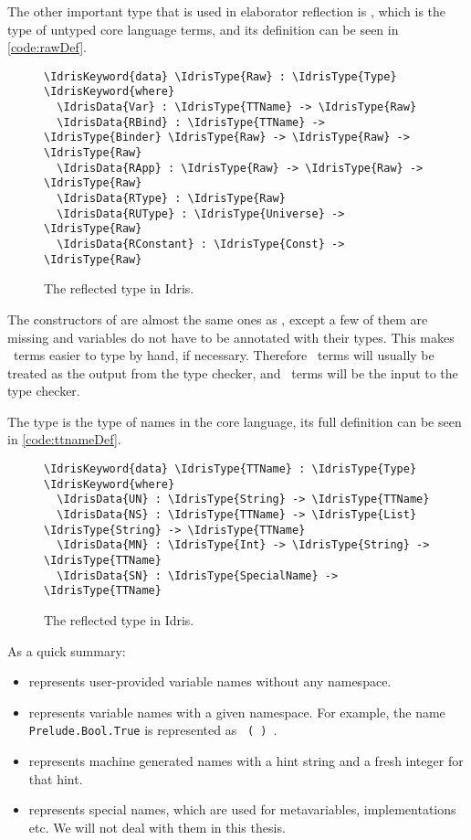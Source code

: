 The other important type that is used in elaborator reflection is ,
which is the type of untyped core language terms, and its definition can be
seen in \autoref{code:rawDef}.

\begin{figure}[ht]
\caption{The reflected type \protect{} in Idris.}
\label{code:rawDef}
\begin{Verbatim}[framesep=2mm, label=\footnotesize{\normalfont{Idris}}, labelposition=topline]
\IdrisKeyword{data} \IdrisType{Raw} : \IdrisType{Type} \IdrisKeyword{where}
  \IdrisData{Var} : \IdrisType{TTName} -> \IdrisType{Raw}
  \IdrisData{RBind} : \IdrisType{TTName} -> \IdrisType{Binder} \IdrisType{Raw} -> \IdrisType{Raw} -> \IdrisType{Raw}
  \IdrisData{RApp} : \IdrisType{Raw} -> \IdrisType{Raw} -> \IdrisType{Raw}
  \IdrisData{RType} : \IdrisType{Raw}
  \IdrisData{RUType} : \IdrisType{Universe} -> \IdrisType{Raw}
  \IdrisData{RConstant} : \IdrisType{Const} -> \IdrisType{Raw}
\end{Verbatim}
\end{figure}

The constructors of  are almost the same ones as \TT,
except a few of them are missing and variables do not have to be annotated with
their types. This makes \Raw\ terms easier to type by hand, if necessary.
Therefore \TT\ terms will usually be treated as the output from the type
checker, and \Raw\ terms will be the input to the type checker.

The  type is the type of names in the core language, its full definition can be seen in \autoref{code:ttnameDef}.

\begin{figure}[ht]
\caption{The reflected type \protect{} in Idris.}
\label{code:ttnameDef}
\begin{Verbatim}[framesep=2mm, label=\footnotesize{\normalfont{Idris}}, labelposition=topline]
\IdrisKeyword{data} \IdrisType{TTName} : \IdrisType{Type} \IdrisKeyword{where}
  \IdrisData{UN} : \IdrisType{String} -> \IdrisType{TTName}
  \IdrisData{NS} : \IdrisType{TTName} -> \IdrisType{List} \IdrisType{String} -> \IdrisType{TTName}
  \IdrisData{MN} : \IdrisType{Int} -> \IdrisType{String} -> \IdrisType{TTName}
  \IdrisData{SN} : \IdrisType{SpecialName} -> \IdrisType{TTName}
\end{Verbatim}
\end{figure}

As a quick summary:
\begin{itemize}
\item{} represents user-provided variable names without any namespace.
\item{} represents variable names with a given namespace. For example, the name \texttt{Prelude.Bool.True} is represented as
  \mbox{\texttt{ ( ) }}.
\item{} represents machine generated names with a hint string and a fresh integer for that hint.
\item{} represents special names, which are used for metavariables, implementations etc. We will not deal with them in this thesis.
\end{itemize}


